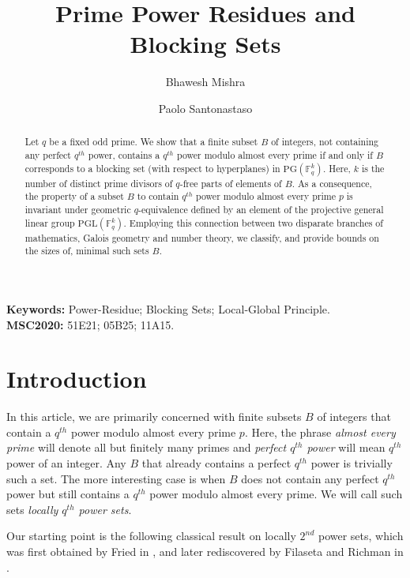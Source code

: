 \documentclass[12pt]{amsart}
\title{Prime Power Residues and Blocking Sets}
\author[B. Mishra]{Bhawesh Mishra} \author[P. Santonastaso]{Paolo Santonastaso}
\date{}
\newcommand{\F}{{\mathbb F}}
\newcommand{\PG}{\mathrm{PG}}
\begin{document}
\begin{abstract}
Let $q$ be a fixed odd prime. We show that a finite subset $B$ of integers, not containing any perfect $q^{th}$ power, contains a $q^{th}$ power modulo almost every prime if and only if $B$ corresponds to a blocking set (with respect to hyperplanes) in $\PG(\F_{q}^{k})$. Here, $k$ is the number of distinct prime divisors of $q$-free parts of elements of $B$. As a consequence, the property of a subset $B$ to contain $q^{th}$ power modulo almost every prime $p$ is invariant under geometric $q$-equivalence defined by an element of the projective general linear group $\mathrm{PGL}(\mathbb{F}_{q}^{k})$. Employing this connection between two disparate branches of mathematics, Galois geometry and number theory, we classify, and provide bounds on the sizes of, minimal such sets $B$. 
\end{abstract}



\maketitle

\noindent
\textbf{Keywords:} Power-Residue; Blocking Sets; Local-Global Principle.\\
\textbf{MSC2020:}  51E21; 05B25; 11A15.

\section{Introduction}
In this article, we are primarily concerned with finite subsets $B$ of integers that contain a $q^{th}$ power modulo almost every prime $p$. Here, the phrase \textit{almost every prime} will denote all but finitely many primes and \textit{perfect $q^{th}$ power} will mean $q^{th}$ power of an integer. Any $B$ that already contains a perfect $q^{th}$ power is trivially such a set. The more interesting case is when $B$ does not contain any perfect $q^{th}$ power but still contains a $q^{th}$ power modulo almost every prime. We will call such sets \textit{locally $q^{th}$ power sets}. 

Our starting point is the following classical result on locally $2^{nd}$ power sets, which was first obtained by Fried in \cite{fried1969arithmetical}, and later rediscovered by Filaseta and Richman in \cite{filaseta1989sets}. 
\end{document}
